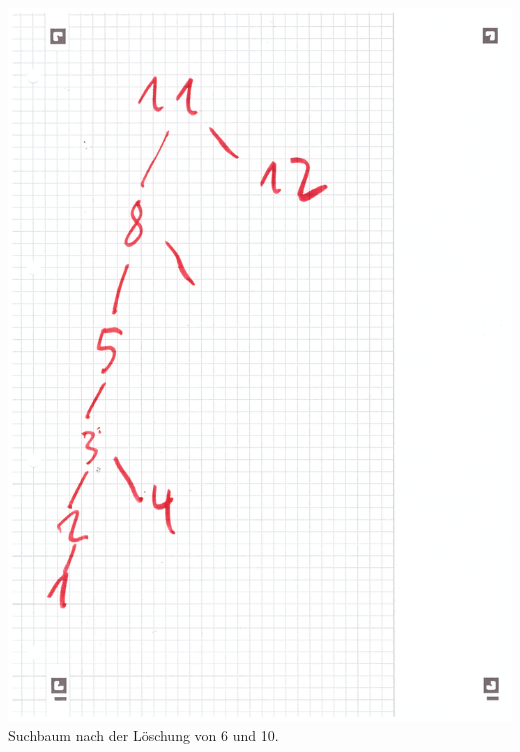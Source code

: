\documentclass{article}
\begin{document}
	\includegraphics[width=\linewidth]{090102} \\
	Suchbaum nach der Löschung von 6 und 10.
\end{document}

